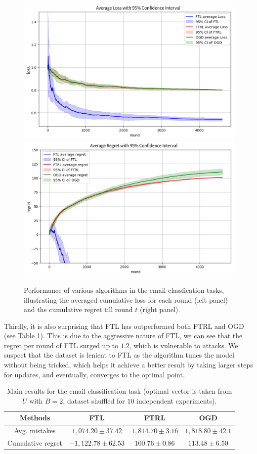 \documentclass{article}
\begin{document}
\begin{figure}[H]
  \centering
  \includegraphics[width=0.48\linewidth]{../LossAvgF.png}
  \includegraphics[width=0.48\linewidth]{../regretAvgF.png}

  \caption{Performance of various algorithms in the email classfication tasks, illustrating the averaged cumulative loss for each round (left panel) and the cumulative regret till round $t$ (right panel).}
\end{figure}

Thirdly, it is also surprising that FTL has outperformed both FTRL and OGD (see Table 1). This is due to the aggressive nature of FTL, we can see that the regret per round of FTL surged up to $1.2$, which is vulnerable to attacks. We suspect that the dataset is lenient to FTL as the algorithm tunes the model without being tricked, which helps it achieve a better result by taking larger steps for updates, and eventually, converges to the optimal point.

\begin{table}[H]
  \centering
  \caption{Main results for the email classification task (optimal vector is taken from $U$ with $B=2$, dataset shuffled for $10$ independent experiments).}

  \begin{tabular}{c c c c}
    \toprule
    \textbf{Methods}  & \textbf{FTL}        & \textbf{FTRL}      & \textbf{OGD}      \\ \midrule
    Avg. mistakes     & $1,074.20\pm37.42$  & $1,814.70\pm 3.16$ & $1,818.80\pm42.1$ \\
    Cumulative regret & $-1,122.78\pm62.53$ & $100.76\pm 0.86$   & $113.48\pm6.50$   \\
    \bottomrule
  \end{tabular}

\end{table}
\end{document}
